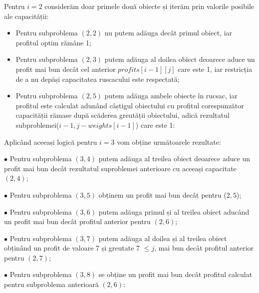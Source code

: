 \begin{sloppypar}

Pentru $i = 2$ considerăm doar primele două obiecte și iterăm prin valorile posibile ale capacității: \par
\begin{itemize}
\item Pentru subproblema $(2,2)$ nu putem adăuga decât primul obiect, iar profitul optim rămâne 1; 
\item Pentru subproblema $(2, 3)$ putem adăuga al doilea obiect deoarece aduce un profit mai bun decât cel anterior $profits[i - 1][j]$ care este 1, iar restricția de a nu depăși capacitatea ruscacului este respectată; 
\item Pentru subproblema $(2, 5)$ putem adăuga ambele obiecte în rucsac, iar profitul este calculat adunând câștigul obiectului cu profitul corespunzător capacității rămase după scăderea greutății obiectului, adică rezultatul subproblemei($i - 1, j - weights[i - 1]$) care este 1: 
\end{itemize}


Aplicând aceeași logică pentru $i = 3$ vom obține următoarele rezultate: \par
$\bullet$ Pentru subproblema $(3, 4)$ putem adăuga al treilea obiect deoarece aduce un profit mai bun decât rezultatul suproblemei anterioare cu aceeași capacitate $(2, 4)$; \par
$\bullet$ Pentru subproblema $(3, 5)$ obținem un profit mai bun decât pentru ($2, 5$); \par
$\bullet$ Pentru subproblema $(3, 6)$ putem adăuga primul și al treilea obiect aducând un profit mai bun decât profitul anterior pentru $(2, 6)$; \par
$\bullet$ Pentru subproblema $(3, 7)$ putem adăuga al doilea și al treilea obiect obținând un profit de valoare 7 și greutate 7 $ \le j$, mai bun decât profitul anterior pentru $(2, 7)$; \par
$\bullet$ Pentru subproblema $(3, 8)$ se obține un profit mai bun decât profitul calculat pentru subproblema anterioară $(2, 6)$: \par


\end{sloppypar}
